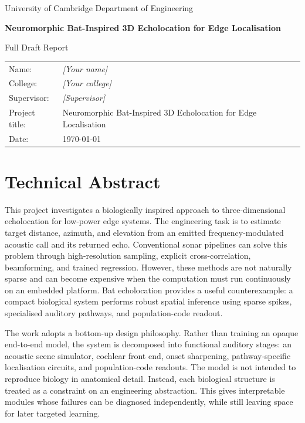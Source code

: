 \documentclass[12pt,a4paper]{report}
\begin{document}
\begin{titlepage}
  \centering
  \vspace*{1.8cm}
  {\Large University of Cambridge Department of Engineering\par}
  \vspace{1.5cm}
  {\Huge\bfseries Neuromorphic Bat-Inspired 3D Echolocation for Edge Localisation\par}
  \vspace{1.2cm}
  {\Large Full Draft Report\par}
  \vfill
  \begin{tabular}{ll}
    Name: & \textit{[Your name]}\\
    College: & \textit{[Your college]}\\
    Supervisor: & \textit{[Supervisor]}\\
    Project title: & Neuromorphic Bat-Inspired 3D Echolocation for Edge Localisation\\
    Date: & \today
  \end{tabular}
\end{titlepage}

\chapter*{Technical Abstract}

This project investigates a biologically inspired approach to three-dimensional echolocation for low-power edge systems. The engineering task is to estimate target distance, azimuth, and elevation from an emitted frequency-modulated acoustic call and its returned echo. Conventional sonar pipelines can solve this problem through high-resolution sampling, explicit cross-correlation, beamforming, and trained regression. However, these methods are not naturally sparse and can become expensive when the computation must run continuously on an embedded platform. Bat echolocation provides a useful counterexample: a compact biological system performs robust spatial inference using sparse spikes, specialised auditory pathways, and population-code readout.

The work adopts a bottom-up design philosophy. Rather than training an opaque end-to-end model, the system is decomposed into functional auditory stages: an acoustic scene simulator, cochlear front end, onset sharpening, pathway-specific localisation circuits, and population-code readouts. The model is not intended to reproduce biology in anatomical detail. Instead, each biological structure is treated as a constraint on an engineering abstraction. This gives interpretable modules whose failures can be diagnosed independently, while still leaving space for later targeted learning.
\end{document}
